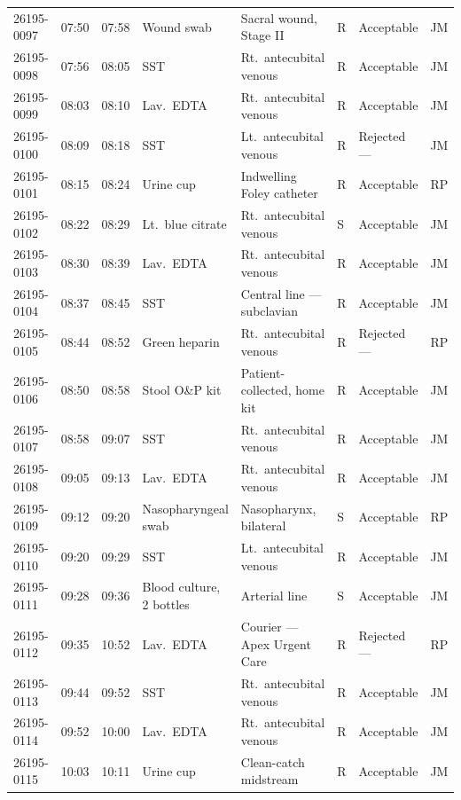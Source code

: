 \begin{center}
{\begin{longtable}{@{}C{1.9cm}C{1.15cm}C{1.15cm}L{2.2cm}L{3.2cm}C{0.7cm}L{2.7cm}C{0.9cm}@{}}
26195-0097 & 07:50 & 07:58 & Wound swab & Sacral wound, Stage II & R & Acceptable & JM \\
26195-0098 & 07:56 & 08:05 & SST & Rt.\ antecubital venous & R & Acceptable & JM \\
26195-0099 & 08:03 & 08:10 & Lav.\ EDTA & Rt.\ antecubital venous & R & Acceptable & JM \\
26195-0100 & 08:09 & 08:18 & SST & Lt.\ antecubital venous & R & Rejected ---  & JM \\
26195-0101 & 08:15 & 08:24 & Urine cup & Indwelling Foley catheter & R & Acceptable & RP \\
26195-0102 & 08:22 & 08:29 & Lt.\ blue citrate & Rt.\ antecubital venous & S & Acceptable & JM \\
26195-0103 & 08:30 & 08:39 & Lav.\ EDTA & Rt.\ antecubital venous & R & Acceptable & JM \\
26195-0104 & 08:37 & 08:45 & SST & Central line --- subclavian & R & Acceptable & JM \\
26195-0105 & 08:44 & 08:52 & Green heparin & Rt.\ antecubital venous & R & Rejected ---  & RP \\
26195-0106 & 08:50 & 08:58 & Stool O\&P kit & Patient-collected, home kit & R & Acceptable & JM \\
26195-0107 & 08:58 & 09:07 & SST & Rt.\ antecubital venous & R & Acceptable & JM \\
26195-0108 & 09:05 & 09:13 & Lav.\ EDTA & Rt.\ antecubital venous & R & Acceptable & JM \\
26195-0109 & 09:12 & 09:20 & Nasopharyngeal swab & Nasopharynx, bilateral & S & Acceptable & RP \\
26195-0110 & 09:20 & 09:29 & SST & Lt.\ antecubital venous & R & Acceptable & JM \\
26195-0111 & 09:28 & 09:36 & Blood culture, 2 bottles & Arterial line & S & Acceptable & JM \\
26195-0112 & 09:35 & 10:52 & Lav.\ EDTA & Courier --- Apex Urgent Care & R & Rejected ---  & RP \\
26195-0113 & 09:44 & 09:52 & SST & Rt.\ antecubital venous & R & Acceptable & JM \\
26195-0114 & 09:52 & 10:00 & Lav.\ EDTA & Rt.\ antecubital venous & R & Acceptable & JM \\
26195-0115 & 10:03 & 10:11 & Urine cup & Clean-catch midstream & R & Acceptable & JM \\

\end{longtable}}
\end{center}
